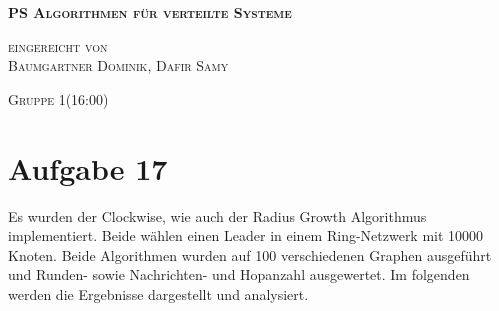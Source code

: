 \documentclass[12pt,a4paper]{report}
\begin{document}
\begin{titlepage}
	\begin{center}

		\vspace*{1.0cm}
		\huge
		\textsc{\bf{PS Algorithmen für verteilte Systeme}}

		\vspace*{4.0cm}
		\textsc{
			\normalsize{eingereicht von} \\[0.5\baselineskip]
			{\large Baumgartner Dominik, Dafir Samy}
		}

		\vspace*{3.0cm}
		\textsc{
			\normalsize{Gruppe  1(16:00)}
		}

	\end{center}
\end{titlepage}

\section*{Aufgabe 17}
Es wurden der Clockwise, wie auch der Radius Growth Algorithmus implementiert. Beide wählen einen Leader in einem Ring-Netzwerk mit 10000 Knoten.
Beide Algorithmen wurden auf 100 verschiedenen Graphen ausgeführt und Runden- sowie Nachrichten- und Hopanzahl ausgewertet.
Im folgenden werden die Ergebnisse dargestellt und analysiert.
\end{document}
